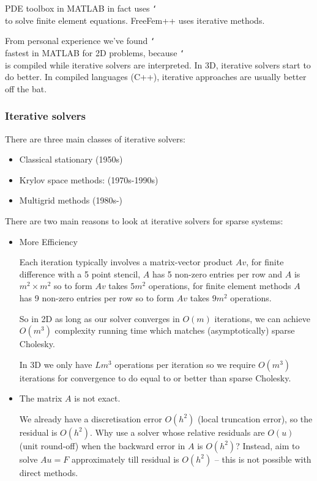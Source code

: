 \documentclass[12pt, a4paper]{article}
\theoremstyle{definition}
\theoremstyle{remark}
\numberwithin{equation}{section}
\newcommand\bslash{\char`\\}
\begin{document}
PDE toolbox in MATLAB in fact uses \texttt{\bslash} to solve finite element equations. FreeFem++ uses iterative methods. 

From personal experience we've found \texttt{\bslash} fastest in MATLAB for 2D problems, because \texttt{\bslash} is compiled while iterative solvers are interpreted.
 In 3D, iterative solvers start to do better. In compiled languages (C++), iterative approaches are usually better off the bat. 

\newpage

\subsubsection{Iterative solvers}
There are three main classes of iterative solvers:
\begin{itemize}
\item Classical stationary (1950s)
\item Krylov space methods: (1970s-1990s)
\item Multigrid methods (1980s-)
\end{itemize}

There are two main reasons to look at iterative solvers for sparse systems:
\begin{itemize}
\item More Efficiency

Each iteration typically involves a matrix-vector product $Av$, for finite difference with a 5 point stencil, $A$ has 5 non-zero entries per row and $A$ is $m^2 \times m^2$ so to form $Av$ takes $5m^2$ operations, for finite element methods $A$ has 9 non-zero entries per row so to form $Av$ takes $9m^2$ operations.

So in 2D as long as our solver converges in $O(m)$ iterations, we can achieve $O(m^3)$ complexity running time which matches (asymptotically) sparse Cholesky.

In 3D we only have $Lm^3$ operations per iteration so we require  $O(m^3)$ iterations for convergence to do equal to or better than sparse Cholesky. 

\item The matrix $A$ is not exact.

We already have a discretisation error $O(h^2)$ (local truncation error), so the residual is $O(h^2)$.
Why use a solver whose relative residuals are $O(u)$ (unit round-off) when the backward error in $A$ is $O(h^2)$?
Instead, aim to solve $Au=F$ approximately till residual is $O(h^2)$ -- this is not possible with direct methods.
\end{itemize}
\end{document}
